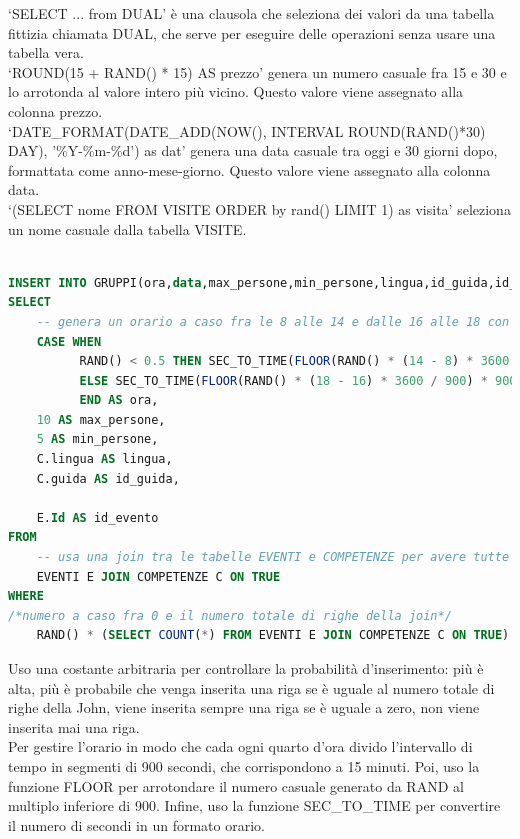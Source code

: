 \documentclass[a4paper,12pt]{report}
\begin{document}
`SELECT ... from DUAL' è
una clausola che seleziona dei valori da una tabella fittizia chiamata DUAL, che
serve per eseguire delle operazioni senza usare una tabella vera.\\
`ROUND(15 + RAND() * 15) AS prezzo' genera un numero casuale fra 15 e 30
e lo arrotonda al valore intero più vicino. Questo valore viene assegnato alla colonna prezzo.\\
`DATE\_FORMAT(DATE\_ADD(NOW(), INTERVAL ROUND(RAND()*30) DAY), '\%Y-\%m-\%d') as dat' genera
una data casuale tra oggi e 30 giorni dopo, formattata come anno-mese-giorno.
Questo valore viene assegnato alla colonna data.\\
`(SELECT nome FROM VISITE ORDER by rand() LIMIT 1) as visita' seleziona un
nome casuale dalla tabella VISITE.

\begin{lstlisting}[style=codeStyle,language=SQL,caption={popolamento della tabella \textbf{GRUPPI}}]
	
INSERT INTO GRUPPI(ora,data,max_persone,min_persone,lingua,id_guida,id_evento)
SELECT 
    -- genera un orario a caso fra le 8 alle 14 e dalle 16 alle 18 con intervalli di ogni quarto d'ora
    CASE WHEN 
          RAND() < 0.5 THEN SEC_TO_TIME(FLOOR(RAND() * (14 - 8) * 3600 / 900) * 900 + 8 * 3600) 
          ELSE SEC_TO_TIME(FLOOR(RAND() * (18 - 16) * 3600 / 900) * 900 + 16 * 3600)
          END AS ora,
    10 AS max_persone,
    5 AS min_persone,
    C.lingua AS lingua,
    C.guida AS id_guida,
     
    E.Id AS id_evento
FROM 
    -- usa una join tra le tabelle EVENTI e COMPETENZE per avere tutte le possibili combinazioni
    EVENTI E JOIN COMPETENZE C ON TRUE
WHERE 
/*numero a caso fra 0 e il numero totale di righe della join*/
    RAND() * (SELECT COUNT(*) FROM EVENTI E JOIN COMPETENZE C ON TRUE) <20;
\end{lstlisting}
Uso una costante arbitraria per controllare la probabilità d'inserimento:
più è alta, più è probabile che venga inserita una riga
se è uguale al numero totale di righe della John, viene inserita sempre una riga
se è uguale a zero, non viene inserita mai una riga.\\
Per gestire l'orario in modo che cada ogni quarto d'ora divido l’intervallo di
tempo in segmenti di 900 secondi, che corrispondono a 15 minuti.
Poi, uso la funzione FLOOR per arrotondare il numero casuale generato da RAND
al multiplo inferiore di 900. Infine, uso la funzione SEC\_TO\_TIME per convertire
il numero di secondi in un formato orario.
\end{document}
